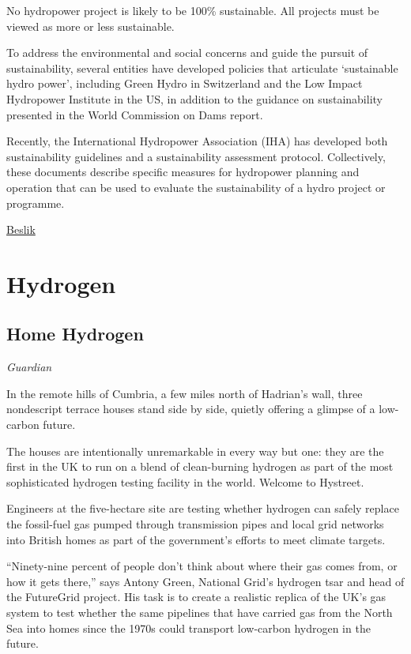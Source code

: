 \documentclass[
]{book}
\begin{document}
No hydropower project is likely to be 100\% sustainable. All projects must be viewed as more or less sustainable.

To address the environmental and social concerns and guide the pursuit of sustainability, several entities have developed policies that articulate `sustainable hydro power', including Green Hydro in Switzerland and the Low Impact Hydropower Institute in the US, in addition to the guidance on sustainability presented in the World Commission on Dams report.

Recently, the International Hydropower Association (IHA) has developed both sustainability guidelines and a sustainability assessment protocol. Collectively, these documents describe specific measures for hydropower planning and operation that can be used to evaluate the sustainability of a hydro project or programme.

\href{https://esgonasunday.substack.com/p/week-17-why-is-no-one-talking-about}{Beslik}

\hypertarget{hydrogen}{%
\chapter{Hydrogen}\label{hydrogen}}

\hypertarget{home-hydrogen}{%
\section{Home Hydrogen}\label{home-hydrogen}}

\emph{Guardian}

In the remote hills of Cumbria, a few miles north of Hadrian's wall, three nondescript terrace houses stand side by side, quietly offering a glimpse of a low-carbon future.

The houses are intentionally unremarkable in every way but one: they are the first in the UK to run on a blend of clean-burning hydrogen as part of the most sophisticated hydrogen testing facility in the world. Welcome to Hystreet.

Engineers at the five-hectare site are testing whether hydrogen can safely replace the fossil-fuel gas pumped through transmission pipes and local grid networks into British homes as part of the government's efforts to meet climate targets.

``Ninety-nine percent of people don't think about where their gas comes from, or how it gets there,'' says Antony Green, National Grid's hydrogen tsar and head of the FutureGrid project. His task is to create a realistic replica of the UK's gas system to test whether the same pipelines that have carried gas from the North Sea into homes since the 1970s could transport low-carbon hydrogen in the future.
\end{document}
